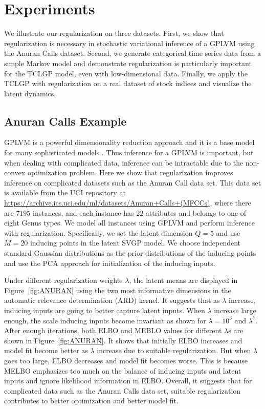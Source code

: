 \documentclass{article}
\begin{document}
\section{Experiments} \label{sec:E}
We illustrate our regularization on three datasets. First, we show that regularization is necessary in stochastic variational inference of a GPLVM using the Anuran Calls dataset. Second, we generate categorical time series data from a simple Markov model and demonstrate regularization is particularly important for the TCLGP model, even with low-dimensional data. Finally, we apply the TCLGP with regularization on a real dataset of stock indices and visualize the latent dynamics.

\subsection{Anuran Calls Example} \label{sec:Anuran}
GPLVM is a powerful dimensionality reduction approach \citep{Lawrence_2003, Lawrence_2007} and it is a base model for many sophisticated models \citep{Lawrence_2007_HGP, Urtasun_2007, Damianou_2016}. Thus inference for a GPLVM is important, but when dealing with complicated data, inference can be intractable due to the non-convex optimization problem. Here we show that regularization improves inference on complicated datasets such as the Anuran Call data set. This data set is available from the UCI repository at \url{https://archive.ics.uci.edu/ml/datasets/Anuran+Calls+(MFCCs)}, where there are $7195$ instances, and each instance has $22$ attributes and belongs to one of eight Genus types. We model all instances using GPLVM and perform inference with regularization. Specifically, we set the latent dimension $Q = 5$ and use $M = 20$ inducing points in the latent SVGP model. We choose independent standard Gaussian distributions as the prior distributions of the inducing points and use the PCA approach for initialization of the inducing inputs.

Under different regularization weights $\lambda$, the latent means are displayed in Figure~\ref{fig:ANURAN} using the two most informative dimensions in the automatic relevance determination (ARD) kernel. It suggests that as $\lambda$ increase, inducing inputs are going to better capture latent inputs. When $\lambda$ increase large enough, the scale inducing inputs become invariant as shown for $\lambda = 10^3$ and $\lambda^7$. After enough iterations, both ELBO and MEBLO values for different $\lambda$s are shown in Figure~\ref{fig:ANURAN}. It shows that initially ELBO increases and model fit become better as $\lambda$ increase due to suitable regularization. But when $\lambda$ goes too large, ELBO decreases and model fit becomes worse. This is because MELBO emphasizes too much on the balance of inducing inputs and latent inputs and ignore likelihood information in ELBO. Overall, it suggests that for complicated data such as the Anuran Calls data set, suitable regularization contributes to better optimization and better model fit.
\end{document}
